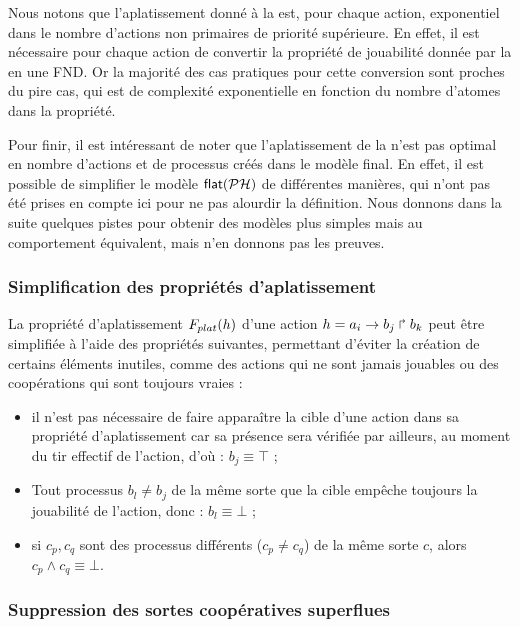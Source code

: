 Nous notons que l'aplatissement donné à la 
est, pour chaque action, exponentiel dans le nombre d'actions non primaires de
priorité supérieure.
En effet, il est nécessaire pour chaque action de convertir la propriété de jouabilité
donnée par la  en une FND.
Or la majorité des cas pratiques pour cette conversion sont proches du pire cas,
qui est de complexité exponentielle en fonction du nombre d'atomes dans la propriété.

Pour finir, il est intéressant de noter que l'aplatissement de la 
n'est pas optimal en nombre d'actions et de processus créés dans le modèle final.
En effet, il est possible de simplifier le modèle $\mathsf{flat}(\mathcal{PH})$ de différentes manières,
qui n'ont pas été prises en compte ici pour ne pas alourdir la définition.
Nous donnons dans la suite quelques pistes pour obtenir des modèles plus simples
mais au comportement équivalent, mais n'en donnons pas les preuves.

\subsubsection{Simplification des propriétés d'aplatissement}

La propriété d'aplatissement $F_{plat}(h)$ d'une action $h = a_i\rightarrow b_j\Rsh b_k$ peut être
simplifiée à l'aide des propriétés suivantes, permettant d'éviter la création
de certains éléments inutiles, comme des actions qui ne sont jamais jouables
ou des coopérations qui sont toujours vraies :
\begin{itemize}
  \item il n'est pas nécessaire de faire apparaître la cible d'une action dans
    sa propriété d'aplatissement car sa présence sera vérifiée par ailleurs,
    au moment du tir effectif de l'action,
    d'où : $b_j \equiv \top$ ;
  \item Tout processus $b_l \neq b_j$ de la même sorte que la cible empêche toujours la jouabilité
    de l'action, donc : $b_l \equiv \bot$ ;
  \item si $c_p, c_q$ sont des processus différents ($c_p \neq c_q$) de la même sorte $c$,
    alors $c_p \wedge c_q \equiv \bot$.
\end{itemize}

\subsubsection{Suppression des sortes coopératives superflues}

